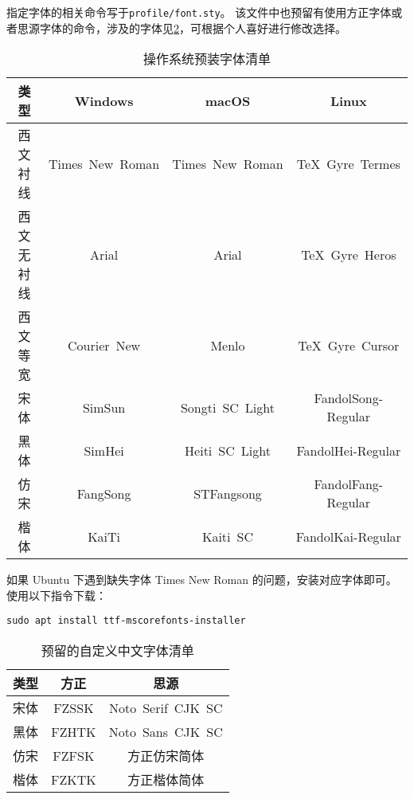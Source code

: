    
       




指定字体的相关命令写于\texttt{profile/font.sty}。
该文件中也预留有使用方正字体或者思源字体的命令，涉及的字体见\cref{tab:userfontset}，可根据个人喜好进行修改选择。

\begin{table}[htbp]
    \caption{操作系统预装字体清单}
    \label{tab:defaultfontset}
    \begin{tabular}{cccc}
        \toprule
        类型 & Windows & macOS & Linux \\
        \midrule
        西文衬线 & Times~New~Roman & Times~New~Roman & TeX~Gyre~Termes \\
        西文无衬线 & Arial & Arial & TeX~Gyre~Heros \\
        西文等宽 & Courier~New & Menlo & TeX~Gyre~Cursor \\
        宋体 & SimSun & Songti~SC~Light &FandolSong-Regular \\
        黑体 & SimHei & Heiti~SC~Light & FandolHei-Regular \\
        仿宋 & FangSong & STFangsong & FandolFang-Regular \\
        楷体 & KaiTi & Kaiti~SC & FandolKai-Regular \\
        \bottomrule
    \end{tabular}
\end{table}

如果 Ubuntu 下遇到缺失字体 Times New Roman 的问题，安装对应字体即可。使用以下指令下载：
\begin{lstlisting}
sudo apt install ttf-mscorefonts-installer
\end{lstlisting}

\begin{table}[htbp]
    \caption{预留的自定义中文字体清单}
    \label{tab:userfontset}
    \begin{tabular}{ccc}
        \toprule
        类型 & 方正 & 思源 \\
        \midrule
        宋体 & FZSSK & Noto~Serif~CJK~SC \\
        黑体 & FZHTK & Noto~Sans~CJK~SC \\
        仿宋 & FZFSK & 方正仿宋简体 \\
        楷体 & FZKTK & 方正楷体简体 \\
        \bottomrule
    \end{tabular}
\end{table}

